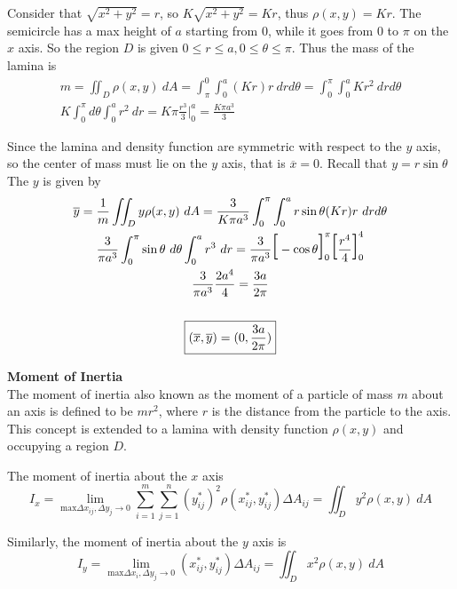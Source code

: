 \documentclass{article}
\begin{document}
  Consider that $ \sqrt{x^{2}+y^{2}}=r  $, so $ K\sqrt{x^{2}+y^{2}}=Kr $, thus $ \rho(x,y)=Kr $.  The semicircle has a max height of $ a $ starting from $ 0 $, while it goes from $ 0 $ to $ \pi $ on the $ x $ axis. So the region $ D $ is given $ 0 \le r \le a, 0 \le \theta \le \pi $. Thus the mass of the lamina is
  \[
    \begin{gathered}
    m = \iint_D \rho(x,y)~dA= \int^{0}_{\pi} \int^{a}_{0} (Kr) r~drd\theta= \int^{\pi}_{0} \int^{a}_{0} Kr^{2} ~ drd\theta\\
    K \int^{\pi}_{0} d\theta \int^{a}_{0} r^{2} ~ dr = K\pi\frac{r^{3}}{3}\bigg|^{a}_0=\frac{K\pi a^{3}}{3} 
    \end{gathered}
  \]

  Since the lamina and density function are symmetric with respect to the $ y $ axis, so the center of mass must lie on the $ y $ axis, that is $ \overline{x}=0 $. Recall that $ y= r\sin{\theta} $ The $ y $ is given by
  \[
    \begin{gathered}
      \overline{y}= \frac{1}{m} \iint_D y\rho(x,y)~dA = \frac{3}{K\pi a^{3}} \int^{\pi}_{0} \int^{a}_{0} r\sin{\theta} (Kr)r~drd\theta\\
      \frac{3}{\pi a^{3}} \int^{\pi}_{0}\sin{\theta}~d\theta \int^{a}_{0} r^{3}~dr = \frac{3}{\pi a^{3}} \text{\huge{[}} -\cos{\theta} \text{\huge{]}}^{\pi}_0 \text{\huge{[}} \frac{r^{4}}{4} \text{\huge{]}}^{4}_0\\
      \frac{3}{\pi a^{3}} \frac{2 a^{4}}{4}= \frac{3a}{2\pi}\\
      ~\\
      \boxed{(\overline{x},\overline{y}) = (0,\frac{3a}{2\pi})}
    \end{gathered}
  \]

  \textbf{Moment of Inertia}\\
  The moment of inertia also known as the moment of a particle of mass $ m $ about an axis is defined to be $ mr^{2} $, where $ r $ is the distance from the particle to the axis. This concept is extended to a lamina with density function $ \rho(x,y) $ and occupying a region $ D $. 

  The moment of inertia about the $ x $ axis
  \[
    I_x = \lim_{\text{max} \Delta x_{ij}, \Delta y_j \to 0}\sum^{m}_{i=1} \sum^{n}_{j=1} (y^{*}_{ij})^{2} \rho(x^{*}_{ij},y^{*}_{ij}) \Delta A_{ij}= \iint_D y^{2}\rho(x,y)~dA
  \]

  Similarly, the moment of inertia about the $ y $ axis is
  \[
    I_y = \lim_{\text{max} \Delta x_i, \Delta y_j \to 0}(x^{*}_{ij},y^{*}_{ij}) \Delta A_{ij} = \iint_D x^{2} \rho(x,y)~dA
  \]
\end{document}

